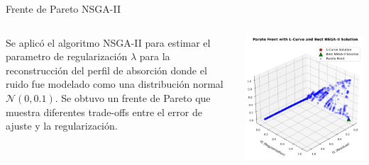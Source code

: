 \documentclass[aspectratio=169,xcolor=dvipsnames]{beamer}
\begin{document}
\begin{frame}{Frente de Pareto NSGA-II}
    \begin{columns}
        \justifying
        Se aplicó el algoritmo NSGA-II para estimar el parametro de regularización $\lambda$ para la reconstrucción del perfil de absorción donde el ruido fue modelado como una distribución normal $\mathcal{N}(0, 0.1)$. Se obtuvo un frente de Pareto que muestra diferentes trade-offs entre el error de ajuste y la regularización.

        \centering
        \includegraphics[width=\textwidth]{img/pareto_front_nsga2.png} \label{fig:pareto_nsga2} 
    \end{columns}
\end{frame}

\end{document}
